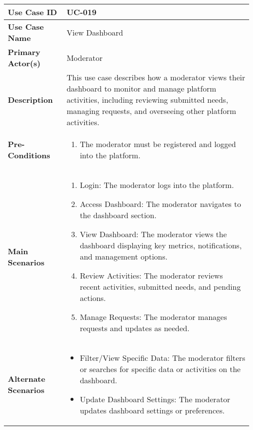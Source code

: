 \begin{table}[!ht]
    \centering
    \renewcommand{\arraystretch}{1.3} %
    \begin{tabularx}{\textwidth}{|l|X|}
        \hline
        \textbf{Use Case ID} & UC-019 \\
        \hline
        \textbf{Use Case Name} & View Dashboard \\
        \hline
        \textbf{Primary Actor(s)} & Moderator \\
        \hline
        \textbf{Description} & This use case describes how a moderator views their dashboard to monitor and manage platform activities, including reviewing submitted needs, managing requests, and overseeing other platform activities. \\
        \hline
        \textbf{Pre-Conditions} & 
        \begin{enumerate}[label=\arabic*.,itemsep=0pt]
            \item The moderator must be registered and logged into the platform.
        \end{enumerate} \\
        \hline
        \textbf{Main Scenarios} & 
        \begin{enumerate}[label=\arabic*.,itemsep=0pt]
            \item Login: The moderator logs into the platform.
            \item Access Dashboard: The moderator navigates to the dashboard section.
            \item View Dashboard: The moderator views the dashboard displaying key metrics, notifications, and management options.
            \item Review Activities: The moderator reviews recent activities, submitted needs, and pending actions.
            \item Manage Requests: The moderator manages requests and updates as needed.
        \end{enumerate} \\
        \hline
        \textbf{Alternate Scenarios} & 
        \begin{itemize}[label=--,itemsep=0pt]
            \item Filter/View Specific Data: The moderator filters or searches for specific data or activities on the dashboard.
            \item Update Dashboard Settings: The moderator updates dashboard settings or preferences.
        \end{itemize} \\

\end{tabularx}
\end{table}
